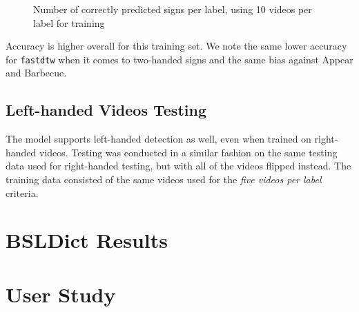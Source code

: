 \documentclass[final,rdr32.tex]{subfiles}
\begin{document}
\begin{figure}[H]
    \begin{center}
    \end{center}
    \caption{Number of correctly predicted signs per label, using 10 videos per label for training}
    \label{bar:three}
\end{figure}

Accuracy is higher overall for this training set. We note the same lower accuracy for \verb|fastdtw| when it comes to two-handed signs and the same bias against Appear and Barbecue.

\subsection{Left-handed Videos Testing}

The model supports left-handed detection as well, even when trained on right-handed videos. Testing was conducted in a similar fashion on the same testing data used for right-handed testing, but with all of the videos flipped instead. The training data consisted of the same videos used for the \textit{five videos per label} criteria.

\section{BSLDict Results}

\section{User Study}
\end{document}

